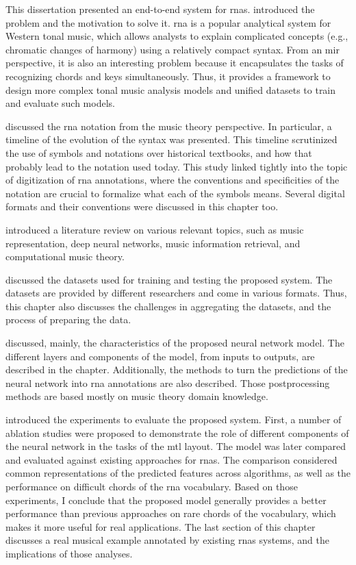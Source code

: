 
This dissertation presented an end-to-end system for
\glspl{rna}.  introduced the problem
and the motivation to solve it. \gls{rna} is a popular
analytical system for Western tonal music, which allows
analysts to explain complicated concepts (e.g., chromatic
changes of harmony) using a relatively compact syntax. From
an \gls{mir} perspective, it is also an interesting problem
because it encapsulates the tasks of recognizing chords and
keys simultaneously. Thus, it provides a framework to design
more complex tonal music analysis models and unified
datasets to train and evaluate such models.

 discussed the
\gls{rna} notation from the music theory perspective. In
particular, a timeline of the evolution of the syntax was
presented. This timeline scrutinized the use of symbols and
notations over historical textbooks, and how that probably
lead to the notation used today. This study linked tightly
into the topic of digitization of \gls{rna} annotations,
where the conventions and specificities of the notation are
crucial to formalize what each of the symbols means. Several
digital formats and their conventions were discussed in this
chapter too.

 introduced a literature review on
various relevant topics, such as music representation, deep
neural networks, music information retrieval, and
computational music theory.

 discussed the
datasets used for training and testing the proposed system.
The datasets are provided by different researchers and come
in various formats. Thus, this chapter also discusses the
challenges in aggregating the datasets, and the process of
preparing the data.

 discussed, mainly, the characteristics
of the proposed neural network model. The different layers
and components of the model, from inputs to outputs, are
described in the chapter. Additionally, the methods to turn
the predictions of the neural network into \gls{rna}
annotations are also described. Those postprocessing methods
are based mostly on music theory domain knowledge.

 introduced the experiments
to evaluate the proposed system. First, a number of ablation
studies were proposed to demonstrate the role of different
components of the neural network in the tasks of the
\gls{mtl} layout. The model was later compared and evaluated
against existing approaches for \glspl{rna}. The comparison
considered common representations of the predicted features
across algorithms, as well as the performance on difficult
chords of the \gls{rna} vocabulary. Based on those
experiments, I conclude that the proposed model generally
provides a better performance than previous approaches on
rare chords of the vocabulary, which makes it more useful
for real applications. The last section of this chapter
discusses a real musical example annotated by existing
\glspl{rna} systems, and the implications of those analyses.
